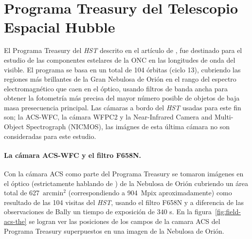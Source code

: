 \section{Programa Treasury del Telescopio Espacial Hubble}
\label{sec:wfpc2}

El Programa Treasury del \textit{HST} descrito en el artículo de \citet{Robberto:2013a}, fue destinado para el estudio de las componentes estelares de la ONC en las longitudes de onda del visible. El programa se basa en un total de 104 órbitas (ciclo 13), cubriendo las regiones más brillantes de la Gran Nebulosa de Orión en el rango del espectro electromagnético que caen en el óptico, usando filtros de banda ancha para obtener la fotometría más precisa del mayor número posible de objetos de baja masa presecuencia principal. Las cámaras a bordo del \textit{HST} usadas para este fin son; la ACS-WFC, la  cámara  WFPC2 y la Near-Infrared Camera and Multi-Object Spectrograph (NICMOS), las imágnes de esta última cámara no son consideradas para este estudio. \\    

\paragraph{La cámara ACS-WFC y el filtro F658N.}
Con la cámara ACS como parte del Programa Treasury se tomaron imágenes en el óptico (estrictamente hablando de \ha{}) de la Nebulosa de Orión cubriendo un área total de 627~\(\mathrm{arcmin^2}\) (correspondiendo a 904~Mpix aproximadamente) como resultado de las 104 visitas del \textit{HST}, usando el filtro F658N y a diferencia de las observaciones de Bally un tiempo de exposición de 340 s. En la figura~\ref{fig:field-acs-the} se logran ver las posiciones de los campos de la camara ACS del Programa Treasury superpuestos en una imagen de la Nebulosa de Orión. \\

